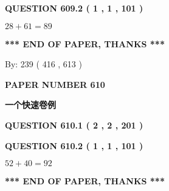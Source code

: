 \documentclass{ctexart}
\begin{document}
  
  
\vspace{0.2in}
  
{\textbf{\Large{QUESTION
609.2 
 ( 1 , 1 , 101 )
}}}
  
  
 
 

$ %
28 +  %
61=   %
89$
 
 
   
   
 \vspace{0.2in}
 
   
   
   
   
\vspace{1.0in} 
{\textbf{\large{ *** END OF PAPER, THANKS *** }}} 
   
   
\hspace{1.0in} By: 
 239 ( 416 ,  613 )
   
   
   
   
\newpage 
\setcounter{page}{ 
   610001 } 
   
   
   
   
 {\textbf{ \Large{ PAPER NUMBER  610  }}}
   
   
\vspace{0.2in}
   
   
   
   
   
   
 \vspace{0.2in}
{\LARGE {\textbf{ 一个快速卷例}}}
   
   
  
\vspace{0.2in}
  
{\textbf{\Large{QUESTION
610.1 
 ( 2 , 2 , 201 )
}}}
  
  
  
\vspace{0.2in}
  
{\textbf{\Large{QUESTION
610.2 
 ( 1 , 1 , 101 )
}}}
  
  
 
 

$ %
52 +  %
40=   %
92$
 
 
   
   
 \vspace{0.2in}
 
   
   
   
   
\vspace{1.0in} 
{\textbf{\large{ *** END OF PAPER, THANKS *** }}} 
   
\end{document}
